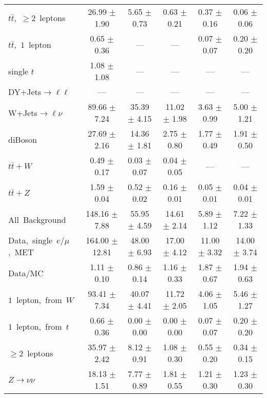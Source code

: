 \documentclass{article}
\begin{document}
\begin{longtable}{|l|c|c|c|c|c|}
$t\bar{t}$,~$\ge2$~leptons & 26.99 $\pm$ 1.90  & 5.65 $\pm$ 0.73  & 0.63 $\pm$ 0.21  & 0.37 $\pm$ 0.16  & 0.06 $\pm$ 0.06 \\* 
$t\bar{t}$,~$1$~lepton & 0.65 $\pm$ 0.36  & ---  & ---  & 0.07 $\pm$ 0.07  & 0.20 $\pm$ 0.20 \\* 
single $t$  & 1.08 $\pm$ 1.08  & ---  & ---  & ---  & --- \\* 
DY+Jets$\rightarrow\ell\ell$  & ---  & ---  & ---  & ---  & --- \\* 
W+Jets$\rightarrow\ell\nu$  & 89.66 $\pm$ 7.24  & 35.39 $\pm$ 4.15  & 11.02 $\pm$ 1.98  & 3.63 $\pm$ 0.99  & 5.00 $\pm$ 1.21 \\* 
diBoson  & 27.69 $\pm$ 2.16  & 14.36 $\pm$ 1.81  & 2.75 $\pm$ 0.80  & 1.77 $\pm$ 0.49  & 1.91 $\pm$ 0.50 \\* 
$t\bar{t}+W$  & 0.49 $\pm$ 0.17  & 0.03 $\pm$ 0.07  & 0.04 $\pm$ 0.05  & ---  & --- \\* 
$t\bar{t}+Z$  & 1.59 $\pm$ 0.04  & 0.52 $\pm$ 0.02  & 0.16 $\pm$ 0.01  & 0.05 $\pm$ 0.01  & 0.04 $\pm$ 0.01 \\* 
\hline \hline 
All~Background  & 148.16 $\pm$ 7.88  & 55.95 $\pm$ 4.59  & 14.61 $\pm$ 2.14  & 5.89 $\pm$ 1.12  & 7.22 $\pm$ 1.33 \\* 
Data,~single~$e/\mu$,~MET  & 164.00 $\pm$ 12.81  & 48.00 $\pm$ 6.93  & 17.00 $\pm$ 4.12  & 11.00 $\pm$ 3.32  & 14.00 $\pm$ 3.74 \\* 
Data/MC  & 1.11 $\pm$ 0.10  & 0.86 $\pm$ 0.14  & 1.16 $\pm$ 0.33  & 1.87 $\pm$ 0.67  & 1.94 $\pm$ 0.63 \\* 
\hline \hline 
$1$~lepton,~from~$W$  & 93.41 $\pm$ 7.34  & 40.07 $\pm$ 4.41  & 11.72 $\pm$ 2.05  & 4.06 $\pm$ 1.05  & 5.46 $\pm$ 1.27 \\* 
$1$~lepton,~from~$t$  & 0.66 $\pm$ 0.36  & 0.00 $\pm$ 0.00  & 0.00 $\pm$ 0.00  & 0.07 $\pm$ 0.07  & 0.20 $\pm$ 0.20 \\* 
$\ge2$~leptons  & 35.97 $\pm$ 2.42  & 8.12 $\pm$ 0.91  & 1.08 $\pm$ 0.30  & 0.55 $\pm$ 0.20  & 0.34 $\pm$ 0.15 \\* 
$Z\rightarrow\nu\nu$  & 18.13 $\pm$ 1.51  & 7.77 $\pm$ 0.89  & 1.81 $\pm$ 0.55  & 1.21 $\pm$ 0.30  & 1.23 $\pm$ 0.30 \\* 
\hline 
\end{longtable} 

 
 
 
 
\pagebreak 

 
 
 
 
\end{document}
